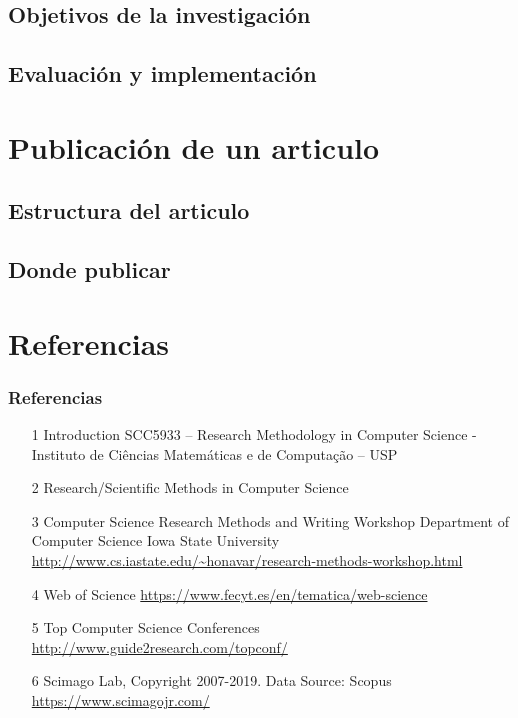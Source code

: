 \documentclass[xcolor={dvipsnames}]{beamer}
\begin{document}
    \subsection{Objetivos de la investigación}
    \subsection{Evaluación y implementación}
    

    \section{Publicación de un articulo}
    \subsection{Estructura del articulo}
    \subsection{Donde publicar}
    


    \section{Referencias}
    \begin{frame}[allowframebreaks]
        \frametitle{Referencias}
        \printbibliography
        \begin{enumerate}
            \item [1] Introduction SCC5933 – Research Methodology in Computer Science - Instituto de Ciências Matemáticas e de Computação – USP
            \item [2] Research/Scientific Methods in Computer Science
            \item [3] Computer Science Research Methods and Writing Workshop Department of Computer Science Iowa State University \url{http://www.cs.iastate.edu/~honavar/research-methods-workshop.html}
            \item [4] Web of Science \url{https://www.fecyt.es/en/tematica/web-science}
            \item [5] Top Computer Science Conferences \url{http://www.guide2research.com/topconf/} 
            \item [6] Scimago Lab, Copyright 2007-2019. Data Source: Scopus \url{https://www.scimagojr.com/}
        \end{enumerate}
    \end{frame}
\end{document}
